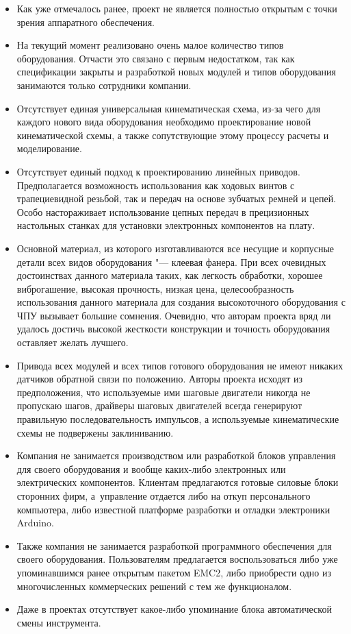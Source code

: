 \begin{itemize}
	\item Как уже отмечалось ранее, проект не является полностью открытым с точки зрения аппаратного обеспечения.
	
	\item На текущий момент реализовано очень малое количество типов оборудования. Отчасти это связано с первым недостатком, так как спецификации закрыты и разработкой новых модулей и типов оборудования занимаются только сотрудники компании.
	
	\item Отсутствует единая универсальная кинематическая схема, из-за чего для каждого нового вида оборудования необходимо проектирование новой кинематической схемы, а также сопутствующие этому процессу расчеты и моделирование.
	
	\item Отсутствует единый подход к проектированию линейных приводов. Предполагается возможность использования как ходовых винтов с трапециевидной резьбой, так и передач на основе зубчатых ремней и цепей. Особо настораживает использование цепных передач в прецизионных настольных станках для установки электронных компонентов на плату.
	
	\item Основной материал, из которого изготавливаются все несущие и корпусные детали всех видов оборудования "--- клеевая фанера. При всех очевидных достоинствах данного материала таких, как легкость обработки, хорошее виброгашение, высокая прочность, низкая цена, целесообразность использования данного материала для создания высокоточного оборудования с ЧПУ вызывает большие сомнения. Очевидно, что авторам проекта вряд ли удалось достичь высокой жесткости конструкции и точность оборудования оставляет желать лучшего.
	
	\item Привода всех модулей и всех типов готового оборудования не имеют никаких датчиков обратной связи по положению. Авторы проекта исходят из предположения, что используемые ими шаговые двигатели никогда не пропускаю шагов, драйверы шаговых двигателей всегда генерируют правильную последовательность импульсов, а используемые кинематические схемы не подвержены заклиниванию.
	
	\item Компания не занимается производством или разработкой блоков управления для своего оборудования и вообще каких-либо электронных или электрических компонентов. Клиентам предлагаются готовые силовые блоки сторонних фирм, а~управление отдается либо на откуп персонального компьютера, либо известной платформе разработки и отладки электроники Arduino.
	
	\item Также компания не занимается разработкой программного обеспечения для своего оборудования. Пользователям предлагается воспользоваться либо уже упоминавшимся ранее открытым пакетом EMC2, либо приобрести одно из многочисленных коммерческих решений с тем же функционалом.
	
	\item Даже в проектах отсутствует какое-либо упоминание блока автоматической смены инструмента.
	
	
\end{itemize}
